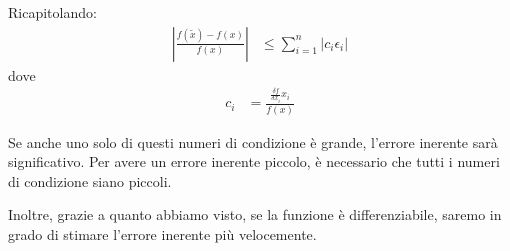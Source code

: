 \documentclass{article}
\numberwithin{equation}{section}
\begin{document}
Ricapitolando:
\begin{equation}
    \begin{aligned}
        \left\lvert \frac{f(\tilde{x})-f(x)}{f(x)}\right\rvert&\leq
        \displaystyle\sum_{i=1}^{n} \left\lvert c_i\epsilon_i\right\rvert
    \end{aligned}
    \label{eq:numero_condizione_1}
\end{equation}
dove 
\begin{equation}
    \begin{aligned}
        c_i&=\frac{\frac{\delta f}{\delta x_i}x_i}{f(x)} 
    \end{aligned} 
    \label{eq:numero_condizione_2}
\end{equation}

Se anche uno solo di questi numeri di condizione è grande, l'errore inerente
sarà significativo. Per avere un errore inerente piccolo, è necessario che
tutti i numeri di condizione siano piccoli.

Inoltre, grazie a quanto abbiamo visto, se la funzione è differenziabile,
saremo in grado di stimare l'errore inerente più velocemente.
\end{document}
